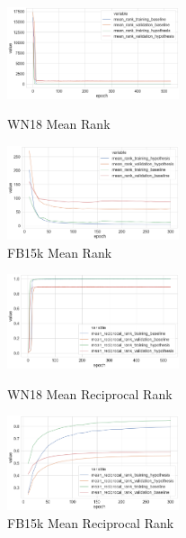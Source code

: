 
\begin{figure}[H]
	\parbox{.5\linewidth}{
   		\centering
    		\includegraphics[width=0.45\textwidth, height=0.2\textheight]{WN18_mean_rank_Results}
		\caption{WN18 Mean Rank}
		}
	\hfill
	\parbox{.5\linewidth}{
   		\centering
		\includegraphics[width=0.45\textwidth, height=0.2\textheight]{FB15k_mean_rank_Results}
		\caption{FB15k Mean Rank}
		}
\end{figure}


\begin{figure}[H]
	\parbox{.5\linewidth}{
   		\centering
    		\includegraphics[width=0.45\textwidth, height=0.2\textheight]{WN18_mean_reciprocal_rank_Results}
		\caption{WN18 Mean Reciprocal Rank}
		}
	\hfill
	\parbox{.5\linewidth}{
   		\centering
		\includegraphics[width=0.45\textwidth, height=0.2\textheight]{FB15k_mean_reciprocal_rank_Results}
		\caption{FB15k Mean Reciprocal Rank}
		}
\end{figure}

